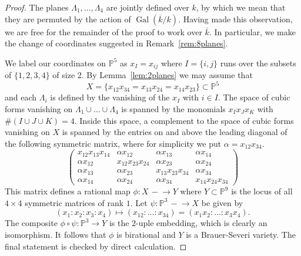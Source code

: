 \documentclass[10pt,a4paper]{amsart}
\newcommand{\Gal}{{\operatorname{Gal}}}
\newcommand{\PP}{{\mathbb P}}
\newcommand{\kbar}{{\overline k}}
\begin{document}
\begin{proof}
  The planes $\Lambda_1, \ldots, \Lambda_4$ are jointly defined over
  $k$, by which we mean that they are permuted by the action of
  $\Gal(\kbar/k)$. Having made this observation, we are free for the
  remainder of the proof to work over $\kbar$.  In particular, we make
  the change of coordinates suggested in Remark~\ref{rem:8planes}.

  We label our coordinates on $\PP^5$ as $x_I = x_{ij}$ where
  $I = \{i,j\}$ runs over the subsets of $\{1,2,3,4\}$ of size 2. By
  Lemma~\ref{lem:2planes} we may assume that
  \[ X = \{ x_{12}x_{34} = x_{13}x_{24} = x_{14}x_{23} \} \subset
    \PP^5 \] and each $\Lambda_i$ is defined by the vanishing of the
  $x_I$ with $i \in I$.  The space of cubic forms vanishing on
  $\Lambda_1 \cup \ldots \cup \Lambda_4$ is spanned by the monomials
  $x_I x_J x_K$ with $\#(I \cup J \cup K) = 4$.  Inside this space, a
  complement to the space of cubic forms vanishing on $X$ is spanned
  by the entries on and above the leading diagonal of the following
  symmetric matrix, where for simplicity we put
  $\alpha = x_{12} x_{34}$.
 \[ \begin{pmatrix}
    x_{12}x_{13}x_{14} & \alpha x_{12} & \alpha x_{13} & \alpha x_{14} \\
    \alpha x_{12} & x_{12}x_{23}x_{24} & \alpha x_{23} & \alpha x_{24} \\
    \alpha x_{13} & \alpha x_{23} & x_{13}x_{23}x_{34} &  \alpha x_{34} \\
    \alpha x_{14} & \alpha x_{24} & \alpha x_{34} & x_{14}x_{24}x_{34}
  \end{pmatrix} \]
  This matrix defines a rational map $\phi : X \, - \!  \to Y$ where
  $Y \subset \PP^9$ is the locus of all $4 \times 4$ symmetric matrices
  of rank $1$.  Let $\psi : \PP^3 \, - \!  \to X$ be given by
 \begin{equation}
 \label{ratparam}
   (x_1: x_2:x_3:x_4) \mapsto (x_{12} : \ldots : x_{34})
   = (x_1x_2 : \ldots : x_3 x_4).
 \end{equation}
 The composite $\phi \circ \psi : \PP^3 \to Y$ is the $2$-uple
 embedding, which is clearly an isomorphism. It follows that $\phi$ is
 birational and $Y$ is a Brauer-Severi variety. The final statement is
 checked by direct calculation.
\end{proof}
\end{document}
